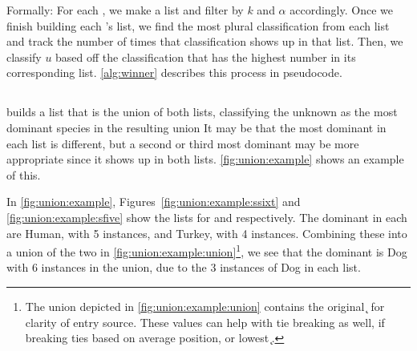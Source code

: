 Formally: For each \compfunc{}, we make a \knnlong{} list and filter by $k$ and $\alpha$ accordingly.
Once we finish building each \compfunc{}'s \knnlong{} list, we find the most plural classification from each list and track the number of times that classification shows up in that list.
Then, we classify $u$ based off the classification that has the highest number in its corresponding list.
\autoref{alg:winner} describes this process in pseudocode.


\subsection{\runion{}}
\runion{} builds a list that is the union of both \knnlong{} lists, classifying the unknown as the most dominant species in the resulting union
It may be that the most dominant \spec{} in each list is different, but a second or third most dominant \spec{} may be more appropriate since it shows up in both lists.
\autoref{fig:union:example} shows an example of this.

In \autoref{fig:union:example}, Figures~\ref{fig:union:example:ssixt} and \ref{fig:union:example:sfive} show the \knnlong{} lists for \Ssixt{} and \Sfive{} respectively.
The dominant \spec{} in each are Human, with 5 instances, and Turkey, with 4 instances.
Combining these into a union of the two in \autoref{fig:union:example:union}\footnote{The union depicted in \autoref{fig:union:example:union} contains the original \k{} for clarity of entry source. These values can help with tie breaking as well, if breaking ties based on average position, or lowest \k{}.}, we see that the dominant \spec{} is Dog with 6 instances in the union, due to the 3 instances of Dog in each \itsshort{} \knnlong{} list.

